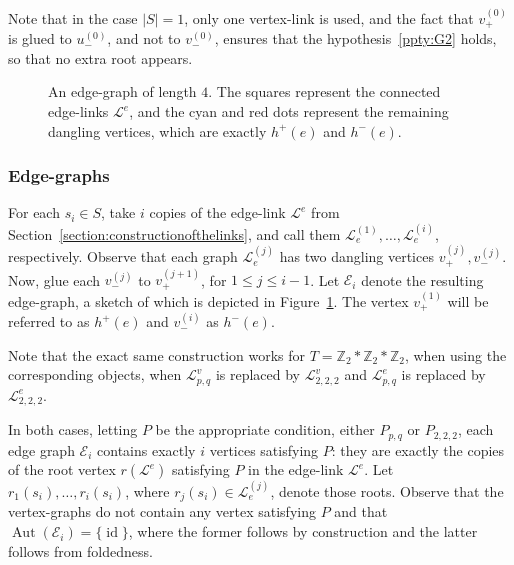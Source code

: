 \documentclass[ALCO,ThmDefs,Unicode,epreuves]{cedram}
\newcommand{\ZZ}{\mathbb{Z}}
\newcommand{\cL}{\mathcal{L}}
\newcommand{\cE}{\mathcal{E}}
\DeclareMathOperator{\aut}{Aut}
\DeclareMathOperator{\id}{id}
\begin{document}
Note that in the case $|S|=1$, only one vertex-link is used, and the fact that $v^{(0)}_{+}$ is glued to $u^{(0)}_{-}$, and not to $v^{(0)}_{-}$, ensures that the hypothesis~\ref{ppty:G2} holds, so that no extra root appears.

\begin{figure}[htb]
\centering
\caption{An edge-graph of length $4$. The squares represent the connected edge-links $\cL^e$, and the cyan and red dots represent the remaining dangling vertices, which are exactly $h^{+}(e)$ and $h^{-}(e)$.}\label{fig:edge-graph}
\end{figure}


\subsubsection*{Edge-graphs}
For each $s_i\in S$, take $i$ copies of the edge-link $\cL^{e}$ from Section~\ref{section:constructionofthelinks}, and call them $\cL_e ^{(1)}, \dots ,\cL_e ^{(i)}$, respectively. Observe that each graph $\cL_e ^{(j)}$ has two dangling vertices $v^{(j)}_+,v^{(j)}_-$. Now, glue each 
$v^{(j)}_{-}$ to $v^{(j+1)}_{+}$, for $1 \leq j \leq i-1$. Let $\cE_i$ denote the resulting edge-graph, a sketch of which is depicted in Figure~\ref{fig:edge-graph}. The vertex $v^{(1)}_+$ will be referred to as $h^{+}(e)$ and $v^{(i)}_-$ as $h^{-}(e)$.

Note that the exact same construction works for $T=\ZZ_2*\ZZ_2*\ZZ_2$, when using the corresponding objects, \ie when $\cL^v_{p,q}$ is replaced by $\cL^v_{2,2,2}$ and $\cL^e_{p,q}$ is replaced by $\cL^e_{2,2,2}$. 

In both cases, letting $P$ be the appropriate condition, \ie either $P_{p,q}$ or $P_{2,2,2}$, each edge graph $\cE_i$ contains exactly $i$ vertices satisfying $P$: they are exactly the copies of the root vertex $r(\cL^e)$ satisfying $P$ in the edge-link $\cL^e$. Let $r_1(s_i), \dots ,r_i(s_i)$, where $r_{j}(s_i) \in \cL_{e}^{(j)}$, denote those roots. Observe that the vertex-graphs do not contain any vertex satisfying $P$ and that $\aut(\cE_i) = \{\id \}$, where the former follows by construction and the latter follows from foldedness. 
\end{document}
